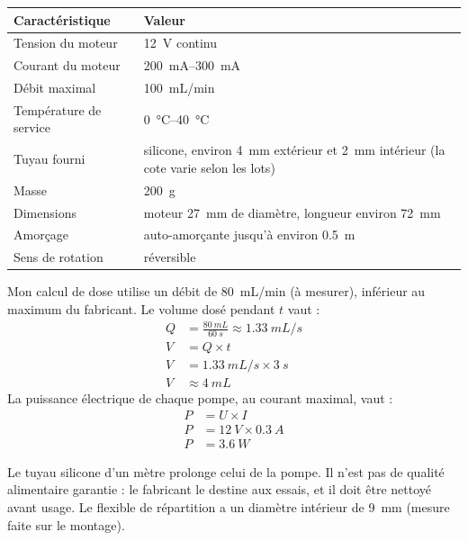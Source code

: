 \noindent
\begin{table}[H]
\centering
\begin{tabularx}{\linewidth}{lY}
\hline
Caractéristique & Valeur \\
\hline
Tension du moteur & \qty{12}{V} continu \\
Courant du moteur & \qtyrange{200}{300}{mA} \\
Débit maximal & \qty{100}{mL/min} \\
Température de service & \qtyrange{0}{40}{\celsius} \\
Tuyau fourni & silicone, environ \qty{4}{mm} extérieur et \qty{2}{mm} intérieur (la cote varie selon les lots) \\
Masse & \qty{200}{g} \\
Dimensions & moteur \qty{27}{mm} de diamètre, longueur environ \qty{72}{mm} \\
Amorçage & auto-amorçante jusqu'à environ \qty{0,5}{m} \\
Sens de rotation & réversible \\
\hline
\end{tabularx}
\end{table}
Mon calcul de dose utilise un débit de \qty{80}{mL/min} (à mesurer), inférieur au maximum du fabricant. Le volume dosé pendant $t$ vaut :
\begin{align*}
Q &= \frac{\qty{80}{mL}}{\qty{60}{s}} \approx \qty{1,33}{mL/s}\\
V &= Q \times t\\
V &= \qty{1,33}{mL/s} \times \qty{3}{s}\\
V &\approx \qty{4}{mL}
\end{align*}
La puissance électrique de chaque pompe, au courant maximal, vaut :
\begin{align*}
P &= U \times I\\
P &= \qty{12}{V} \times \qty{0,3}{A}\\
P &= \qty{3,6}{W}
\end{align*}

\noindent Le tuyau silicone d'un mètre prolonge celui de la pompe. Il n'est pas de qualité alimentaire garantie : le fabricant le destine aux essais, et il doit être nettoyé avant usage. Le flexible de répartition a un diamètre intérieur de \qty{9}{mm} (mesure faite sur le montage).

